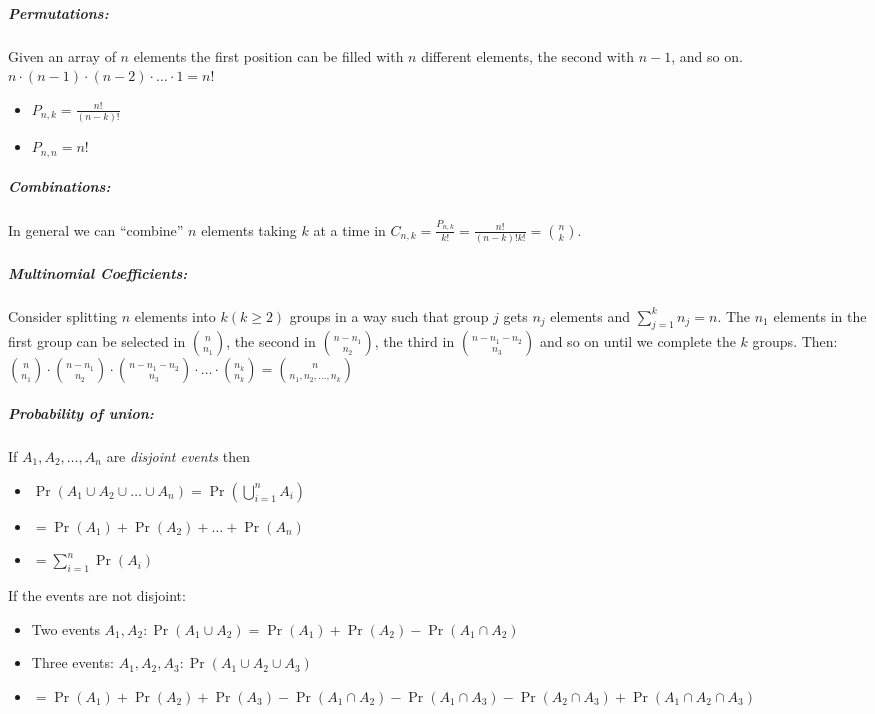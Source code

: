 \documentclass[landscape,10pt]{article}
\begin{document}
    \footnotesize
    \begin{multicols}{4}
    \setlength{\premulticols}{1pt}
    \setlength{\postmulticols}{1pt}
    \setlength{\multicolsep}{1pt}
    \setlength{\columnsep}{2pt}

    \subparagraph*{Permutations: } 
        Given an array of \(n\) elements the first position can be filled with \(n\) different elements, the second with \(n-1\), and so on. \(n \cdot (n-1) \cdot (n-2) \cdot \ldots \cdot 1 = n!\)

        \begin{itemize}
            \item[] \(P_{n,k} = \frac{n!}{(n-k)!}\)
            \item[] \(P_{n,n} = n!\)
        \end{itemize}

    \subparagraph*{Combinations: }
        In general we can ``combine'' \(n\) elements taking \(k\) at a time in \(C_{n,k} = \frac{P_{n,k}}{k!} = \frac{n!}{(n-k)!k!} = {n \choose k} \). 

    \subparagraph*{Multinomial Coefficients: } 
        Consider splitting \(n\) elements into \(k (k \geq 2)\) groups in a way such that group \(j\) gets \(n_j\) elements and \(\sum_{j = 1}^{k}n_j = n\). The \(n_1\) elements in the first group can be selected in \({n \choose n_1}\), the second in \({n-n_1 \choose n_2}\), the third in \({n-n_1-n_2 \choose n_3}\) and so on until we complete the \(k\) groups. Then: \({n \choose n_1}\cdot{n-n_1 \choose n_2}\cdot{n-n_1-n_2 \choose n_3}\cdot \ldots \cdot{n_k \choose n_k} = {n \choose n_1, n_2, \ldots, n_k}\)

    \subparagraph*{Probability of union:}
        If \(A_1, A_2, \ldots, A_n\) are \textit{disjoint events} then 
        \begin{itemize}
            \item[] \(\Pr(A_1 \cup A_2 \cup \ldots \cup A_n) = \Pr(\bigcup\limits_{i=1}^{n}A_i) \)
            \item[] \(= \Pr(A_1) + \Pr(A_2) + \ldots + \Pr(A_n) \)
            \item[] \(= \sum\limits_{i=1}^{n}\Pr(A_i) \)
        \end{itemize}
        \smallskip

    If the events are not disjoint: 
        \begin{itemize}
            \item[] Two events \(A_1, A_2: \Pr(A_1 \cup A_2) = \Pr(A_1) + \Pr(A_2) - \Pr(A_1 \cap A_2)\)
            \item[] Three events: \(A_1, A_2, A_3: \Pr(A_1 \cup A_2 \cup A_3)\)
            \item[] \(= \Pr(A_1) + \Pr(A_2) + \Pr(A_3) - \Pr(A_1 \cap A_2) - \Pr(A_1 \cap A_3) - \Pr(A_2 \cap A_3) + \Pr(A_1 \cap A_2 \cap A_3)\)
        \end{itemize}  


\end{multicols}
\end{document}
